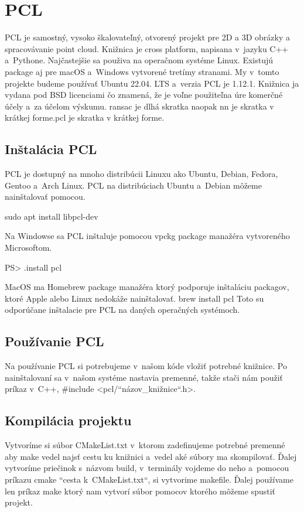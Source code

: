 
\section{PCL}
\noindent   PCL je samostný, vysoko škalovateľný, otvorený projekt pre 2D a 3D obrázky a spracovávanie point cloud. Knižnica je cross platform, napisana v jazyku C++ a Pythone. Najčastejšie sa použiva na operačnom systéme Linux. Existujú package aj pre macOS a Windows vytvorené tretímy stranami. My v tomto projekte budeme používať Ubuntu 22.04. LTS a verzia PCL je  1.12.1. Knižnica ja vydana pod BSD licenciami čo znamená, že je voľne použiteľna úre komerčné účely a za účelom výskumu.
\acrfull{ransac} je dlhá skratka naopak \acrshort{nn} je skratka v krátkej forme.\acrshort{pcl} je skratka v krátkej forme.

\subsection{Inštalácia PCL}
PCL je dostupný na mnoho distribúcii Linuxu ako Ubuntu, Debian, Fedora, Gentoo a Arch Linux. PCL na distribúciach Ubuntu a Debian môžeme nainštalovať pomocou.

sudo apt install libpcl-dev

Na Windowse sa PCL inštaluje pomocou vpckg package manažéra vytvoreného Microsoftom. 

PS> .\vcpkg install pcl

MacOS ma Homebrew package manažéra ktorý podporuje inštaláciu packagov, ktoré Apple alebo Linux nedokáže nainštalovať. 
brew install pcl
Toto su odporúčane inštalacie pre PCL na daných operačných systémoch.

\subsection{Používanie PCL}
Na používanie PCL si potrebujeme v našom kóde vložiť potrebné knižnice. Po nainštalovaní sa v našom systéme nastavia premenné, takže stači nám použiť príkaz v C++, #include <pcl/“názov_knižnice“.h>.
\subsection{Kompilácia projektu}
Vytvoríme si súbor CMakeList.txt v ktorom zadefinujeme potrebné premenné aby make vedel najsť cestu ku knižnici a vedel aké súbory ma skompilovať. Ďalej vytvoríme priečinok s názvom build, v terminály vojdeme do neho a pomocou príkazu cmake “cesta k CMakeList.txt“, si vytvorime makefile. Ďalej používame len príkaz make ktorý nam vytvorí súbor pomocov ktorého môžeme spustiť projekt.
